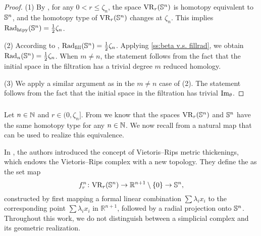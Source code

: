 \begin{proof}
	(1) By \cite[Thm.~7.1]{lim2024vietoris}, for any $0 < r \leq \zeta_n$, the space $\mathrm{VR}_r(\mathbb{S}^n)$ is homotopy equivalent to $\mathbb{S}^n$, and the homotopy type of $\mathrm{VR}_r(\mathbb{S}^n)$ changes at $\zeta_n$.
	This implies $\mathrm{Rad}_{\mathrm{htpy}}(\mathbb{S}^n)=\frac{1}{2}\zeta_n$.

	\smallskip (2) According to \cite{katz1983filling}, \(\mathrm{Rad}_{\mathrm{fill}}(\mathbb{S}^n) = \frac{1}{2}\zeta_n\).
	Applying \cref{ss:beta v.s. fillrad}, we obtain \(\mathrm{Rad}_{n}(\mathbb{S}^n) = \frac{1}{2}\zeta_n\).
    When $m\neq n$, the statement follows from the fact that the initial space in the filtration has a trivial degree $m$ reduced homology.

	\smallskip (3) We apply a similar argument as in the $m\neq n$ case of (2). The statement follows from the fact that the initial space in the filtration has trivial $\operatorname{Im}_\theta$.
\end{proof}

\subsubsection{}\label{ss:VRSn projection}

Let \(n \in \mathbb{N}\) and \(r \in (0, \zeta_n]\).
From \cite[Thm.~7.1]{lim2024vietoris} we know that the spaces \(\mathrm{VR}_r(\mathbb{S}^n)\) and \(\mathbb{S}^n\) have the same homotopy type for any \(n \in \mathbb{N}\).
We now recall from \cite{adamaszek2018metric} a natural map that can be used to realize this equivalence.

In \cite{adamaszek2018metric}, the authors introduced the concept of Vietoris–Rips metric thickenings, which endows the Vietoris–Rips complex with a new topology. 
They define the  as the set map 
\[
f_r^n \colon \mathrm{VR}_r(\mathbb{S}^n) \to \mathbb{R}^{n+1} \setminus \{0\} \to \mathbb{S}^n,
\]
constructed by first mapping a formal linear combination \(\sum \lambda_i x_i\) to the corresponding point \(\sum \lambda_i x_i\) in \(\mathbb{R}^{n+1}\), followed by a radial projection onto \(\mathbb{S}^n\). 
Throughout this work, we do not distinguish between a simplicial complex and its geometric realization. 


